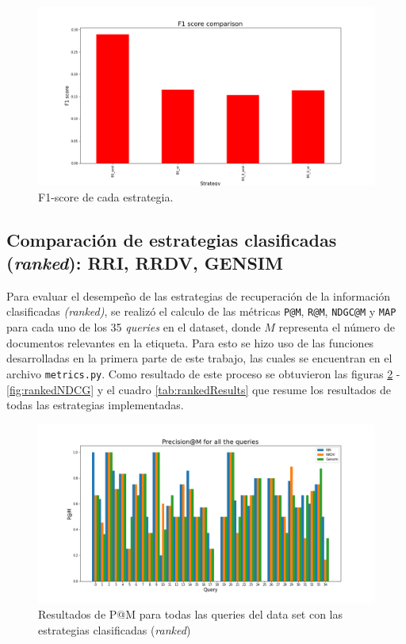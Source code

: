 \begin{figure}[H]
    \centering
    \includegraphics[width=\textwidth]{results/images/BS_f1_comparison.png}
    \caption{F1-score de cada estrategia.}
    \label{fig:F1-score}
\end{figure}


\subsection{Comparación de estrategias clasificadas (\textit{ranked}): RRI, RRDV, GENSIM}

Para evaluar el desempeño de las estrategias de recuperación de la información clasificadas \textit{(ranked)}, se realizó el calculo de las métricas \texttt{P@M}, \texttt{R@M}, \texttt{NDGC@M} y \texttt{MAP} para cada uno de los 35 \textit{queries} en el dataset, donde $M$ representa el número de documentos relevantes en la etiqueta. Para esto se hizo uso de las funciones desarrolladas en la primera parte de este trabajo, las cuales se encuentran en el archivo \texttt{metrics.py}. Como resultado de este proceso se obtuvieron las figuras \ref{fig:rankedP} - \ref{fig:rankedNDCG} y el cuadro \ref{tab:rankedResults} que resume los resultados de todas las estrategias implementadas.

\begin{figure}[H]
    \centering
    \includegraphics[width=\textwidth]{doc/images/P@M_Ranked.png}
    \caption{Resultados de P@M para todas las queries del data set con las estrategias clasificadas (\textit{ranked})}
    \label{fig:rankedP}
\end{figure}



